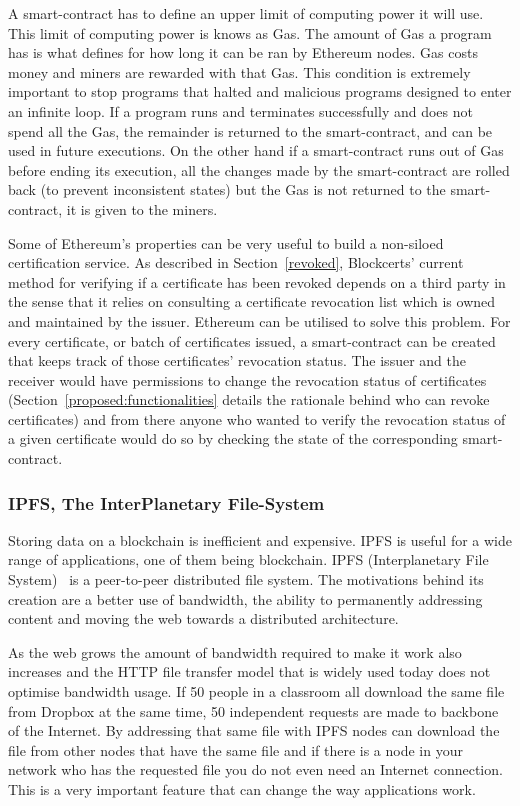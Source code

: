A smart-contract has to define an upper limit of computing power it will use. This limit of computing power is knows as Gas. The amount of Gas a program has is what defines for how long it can be ran by Ethereum nodes. Gas costs money and miners are rewarded with that Gas. This condition is extremely important to stop programs that halted and malicious programs designed to enter an infinite loop. If a program runs and terminates successfully and does not spend all the Gas, the remainder is returned to the smart-contract, and can be used in future executions. On the other hand if a smart-contract runs out of Gas before ending its execution, all the changes made by the smart-contract are rolled back (to prevent inconsistent states) but the Gas is not returned to the smart-contract, it is given to the miners.

Some of Ethereum's properties can be very useful to build a non-siloed certification service. As described in Section~\ref{revoked}, Blockcerts' current method for verifying if a certificate has been revoked depends on a third party in the sense that it relies on consulting a certificate revocation list which is owned and maintained by the issuer. Ethereum can be utilised to solve this problem. For every certificate, or batch of certificates issued, a smart-contract can be created that keeps track of those certificates' revocation status. The issuer and the receiver would have permissions to change the revocation status of certificates (Section~\ref{proposed:functionalities} details the rationale behind who can revoke certificates) and from there anyone who wanted to verify the revocation status of a given certificate would do so by checking the state of the corresponding smart-contract.


\subsubsection{IPFS, The InterPlanetary File-System}
\label{rel:ipfs}

Storing data on a blockchain is inefficient and expensive. IPFS is useful for a wide range of applications, one of them being blockchain. IPFS (Interplanetary File System)~\cite{Benet:2014vw} is a peer-to-peer distributed file system. The motivations behind its creation are a better use of bandwidth, the ability to permanently addressing content and moving the web towards a distributed architecture.

As the web grows the amount of bandwidth required to make it work also increases and the HTTP %
file transfer model that is widely used today does not optimise bandwidth usage. If 50 people in a classroom all download the same file from Dropbox at the same time, 50 independent requests are made to backbone of the Internet. By addressing that same file with IPFS nodes can download the file from other nodes that have the same file and if there is a node in your network who has the requested file you do not even need an Internet connection. This is a very important feature that can change the way applications work.

